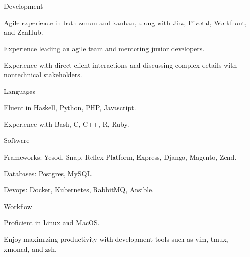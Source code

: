 \begin{cvskills}
  \cvskill
    {Development}
    {\begin{cvitems}
        \item Agile experience in both scrum and kanban, along with Jira,
          Pivotal, Workfront, and ZenHub.
        \item Experience leading an agile team and mentoring junior developers.
        \item Experience with direct client interactions and
          discussing complex details with nontechnical stakeholders.
     \end{cvitems}}
  \cvskill
    {Languages}
    {\begin{cvitems}
        \item Fluent in Haskell, Python, PHP, Javascript.
        \item Experience with Bash, C, C++, R, Ruby.
     \end{cvitems}}
  \cvskill
    {Software}
    {\begin{cvitems}
        \item Frameworks: Yesod, Snap, Reflex-Platform, Express, Django, Magento, Zend.
        \item Databases: Postgres, MySQL.
        \item Devops: Docker, Kubernetes, RabbitMQ, Ansible.
     \end{cvitems}}
  \cvskill
    {Workflow}
    {\begin{cvitems}
        \item Proficient in Linux and MacOS.
        \item Enjoy maximizing productivity with development tools such as
          vim, tmux, xmonad, and zsh.
     \end{cvitems}}
\end{cvskills}
